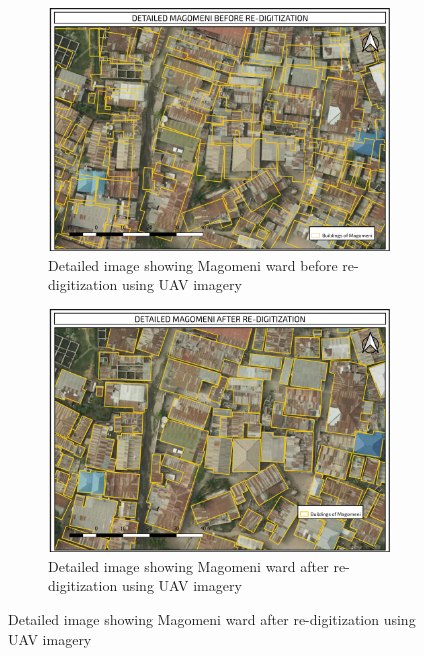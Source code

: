 \documentclass[a4paper,12pt,twoside]{article}
\begin{document}
 \vspace{2mm}
 
\begin{figure}
  \begin{subfigure}[b]{0.5\textwidth}
    \includegraphics[width=\textwidth]{images/Detailed_Magomeni_Before_Redigitization.png}
   \color{RHgreen}\caption{Detailed image showing Magomeni ward before re-digitization using UAV imagery}
    \label{fig:1}
  \end{subfigure}
  \begin{subfigure}[b]{0.5\textwidth}
    \includegraphics[width=\textwidth]{images/Detailed_Magomeni_After_Redigitization.png}
    \color{RHgreen}\caption{Detailed image showing Magomeni ward after re-digitization using UAV imagery}
    \label{fig:2}
  \end{subfigure}
\end{figure}
\end{document}
